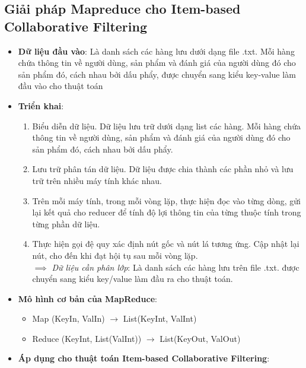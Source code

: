 \documentclass{report}
\begin{document}
\subsection*{Giải pháp Mapreduce cho Item-based Collaborative Filtering}
\begin{itemize}
    \item \textbf{Dữ liệu đầu vào}: Là danh sách các hàng lưu dưới dạng file .txt.
          Mỗi hàng chứa thông tin về người dùng, sản phẩm và đánh giá của người dùng đó
          cho sản phẩm đó, cách nhau bởi dấu phẩy, được chuyển sang kiểu key-value làm
          đầu vào cho thuật toán
    \item \textbf{Triển khai}:
          \begin{enumerate}
              \item Biểu diễn dữ liệu. Dữ liệu lưu trữ dưới dạng list các hàng. Mỗi hàng
                    chứa thông tin về người dùng, sản phẩm và đánh giá của người dùng đó cho
                    sản phẩm đó, cách nhau bởi dấu phẩy.
              \item Lưu trữ phân tán dữ liệu. Dữ liệu được chia thành các phần nhỏ và lưu trữ
                    trên nhiều máy tính khác nhau.
              \item Trên mỗi máy tính, trong mỗi vòng lặp, thực hiện đọc vào từng dòng,
                    gửi lại kết quả cho reducer để tính độ lợi thông tin của từng thuộc tính trong từng phần dữ liệu.
              \item Thực hiện gọi đệ quy xác định nút gốc và nút lá tương ứng.
                    Cập nhật lại nút, cho đến khi đạt hội tụ sau mỗi vòng lặp.\\
                    \vspace{0.2cm}
                    \hspace*{-1cm} $\implies$ \textit{Dữ liệu cần phân lớp}: Là danh sách các hàng lưu trên file .txt. được chuyển sang kiểu key/value làm đầu ra cho thuật toán.
          \end{enumerate}
    \item \textbf{Mô hình cơ bản của MapReduce}:
          \begin{itemize}
              \item Map (KeyIn, ValIn) $\rightarrow$ List(KeyInt, ValInt)
              \item Reduce (KeyInt, List(ValInt)) $\rightarrow$ List(KeyOut, ValOut)
          \end{itemize}
    \item \textbf{Áp dụng cho thuật toán Item-based Collaborative Filtering}:

\end{itemize}
\end{document}
